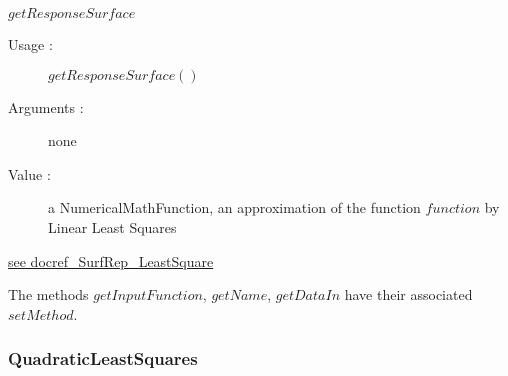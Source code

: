 \begin{description}
\begin{description}
  \item $getResponseSurface$
    \begin{description}
    \item[Usage :] $getResponseSurface()$ %
    \item[Arguments :] none
    \item[Value :] a NumericalMathFunction, an approximation of the function $function$ by Linear Least Squares
    \end{description}

  \end{description}

\item[Links :]
  \href{./Version/docref_SurfRep_LeastSquare_en.pdf}{see docref\_SurfRep\_LeastSquare}
\end{description}

The methods $getInputFunction$, $getName$, $getDataIn$ have their associated $setMethod$.



\newpage \subsubsection{QuadraticLeastSquares}

